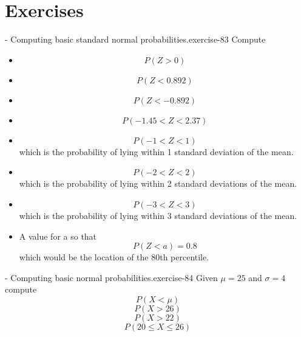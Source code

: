 \documentclass[10pt,]{book}
\numberwithin{equation}{section}
\newcommand{\lt}{<}
\newcommand{\gt}{>}
\begin{document}
\section[{Exercises}]{Exercises}\label{section-64}
\begin{inlineexercise}{- Computing basic standard normal probabilities.}{exercise-83}%
\hypertarget{p-1245}{}%
Compute \leavevmode%
\begin{itemize}[label=\textbullet]
\item{}%
\begin{equation*}
P( Z \gt 0)
\end{equation*}
%
\item{}%
\begin{equation*}
P( Z \lt 0.892)
\end{equation*}
%
\item{}%
\begin{equation*}
P( Z \lt -0.892)
\end{equation*}
%
\item{}%
\begin{equation*}
P( -1.45 \lt Z \lt 2.37)
\end{equation*}
%
\item{}%
\begin{equation*}
P( -1 \lt Z \lt 1)
\end{equation*}
which is the probability of lying within 1 standard deviation of the mean.%
\item{}%
\begin{equation*}
P( -2 \lt Z \lt 2)
\end{equation*}
which is the probability of lying within 2 standard deviations of the mean.%
\item{}%
\begin{equation*}
P( -3 \lt Z \lt 3)
\end{equation*}
which is the probability of lying within 3 standard deviations of the mean.%
\item{}A value for a so that%
\begin{equation*}
P( Z \lt a) = 0.8
\end{equation*}
which would be the location of the 80th percentile.%
\end{itemize}
%
\end{inlineexercise}
\begin{inlineexercise}{- Computing basic normal probabilities.}{exercise-84}%
\hypertarget{p-1246}{}%
Given \(\mu = 25\) and \(\sigma = 4\) compute%
\begin{equation*}
P(X \lt \mu)
\end{equation*}
%
\begin{equation*}
P( X \gt 26)
\end{equation*}
%
\begin{equation*}
P( X \gt 22)
\end{equation*}
%
\begin{equation*}
P( 20 \le X \le 26)
\end{equation*}
%
\end{inlineexercise}
\end{document}
